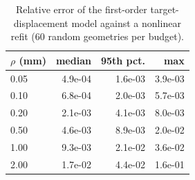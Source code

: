 \begin{table}[h]
\centering\small
\caption{Relative error of the first-order target-displacement model against a nonlinear refit (60 random geometries per budget).}
\label{tab:linearisation}
\begin{tabular}{@{}lrrr@{}}
\toprule
$\rho$ (mm) & median & 95th pct. & max \\
\midrule
0.05 & 4.9e-04 & 1.6e-03 & 3.9e-03 \\
0.10 & 6.8e-04 & 2.0e-03 & 5.7e-03 \\
0.20 & 2.1e-03 & 4.1e-03 & 8.0e-03 \\
0.50 & 4.6e-03 & 8.9e-03 & 2.0e-02 \\
1.00 & 9.3e-03 & 2.1e-02 & 3.6e-02 \\
2.00 & 1.7e-02 & 4.4e-02 & 1.6e-01 \\
\bottomrule
\end{tabular}
\end{table}

